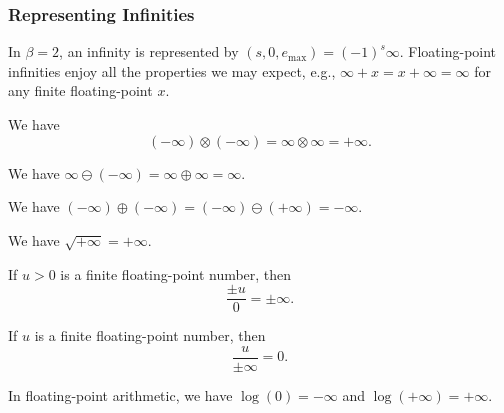 \subsubsection{Representing Infinities}

In $\beta=2$, an infinity is represented by $(s,0,e_{\text{max}})=(-1)^{s}\infty$.
Floating-point infinities enjoy all the properties we may expect, e.g.,
$\infty + x = x + \infty = \infty$ for any finite floating-point $x$.

\begin{axiom}
  We have
  \begin{equation*}
    (-\infty)\otimes(-\infty) = \infty\otimes\infty = +\infty.
  \end{equation*}
\end{axiom}

\begin{axiom}
  We have $\infty\ominus(-\infty)=\infty\oplus\infty=\infty$.
\end{axiom}

\begin{axiom}
  We have $(-\infty)\oplus(-\infty)=(-\infty)\ominus(+\infty)=-\infty$.
\end{axiom}

\begin{axiom}
  We have $\sqrt{+\infty}=+\infty$.
\end{axiom}

\begin{axiom}
  If $u>0$ is a finite floating-point number, then
  \begin{equation*}
    \frac{\pm u}{0} = \pm\infty.
  \end{equation*}
\end{axiom}

\begin{axiom}
  If $u$ is a finite floating-point number, then
  \begin{equation*}
    \frac{u}{\pm\infty}=0.
  \end{equation*}
\end{axiom}

\begin{axiom}
In floating-point arithmetic, we have $\log(0)=-\infty$ and $\log(+\infty)=+\infty$.
\end{axiom}
